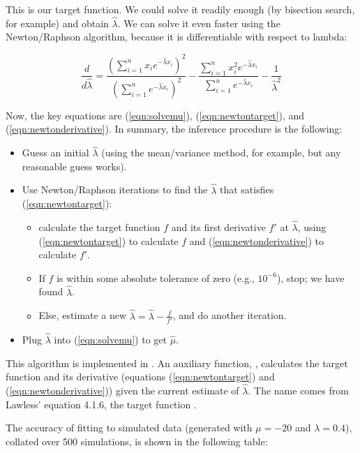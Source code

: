 This is our target function. We could solve it readily enough (by
bisection search, for example) and obtain $\hat{\lambda}$. We can
solve it even faster using the Newton/Raphson algorithm, because it is
differentiable with respect to lambda:

\begin{equation}
\frac{d}{d\hat{\lambda}} = 
\frac{\left( \sum_{i=1}^{n} x_i e^{-\hat{\lambda} x_i} \right)^2 } 
     {\left( \sum_{i=1}^{n} e^{-\hat{\lambda} x_i}     \right)^2 }
-
\frac{\sum_{i=1}^{n} x_i^2 e^{-\hat{\lambda} x_i}}
     {\sum_{i=1}^{n} e^{-\hat{\lambda} x_i}}
-
\frac{1}{\hat{\lambda}^2}
\label{eqn:newtonderivative}
\end{equation}

Now, the key equations are (\ref{eqn:solvemu}),
(\ref{eqn:newtontarget}), and (\ref{eqn:newtonderivative}). In
summary, the inference procedure is the following:

\begin{itemize}
\item Guess an initial $\hat{\lambda}$ (using the mean/variance
  method, for example, but any reasonable guess works).
\item Use Newton/Raphson iterations to find the $\hat{\lambda}$ that satisfies
      (\ref{eqn:newtontarget}):
	\begin{itemize}
	\item calculate the target function $f$ and 
         its first derivative $f'$ at $\hat{\lambda}$, using 
	(\ref{eqn:newtontarget}) to calculate $f$ and 
	(\ref{eqn:newtonderivative}) to calculate $f'$.
	\item If $f$ is within some absolute tolerance of zero 
	(e.g., $10^{-6}$), stop; we have found $\hat{\lambda}$.
	\item Else, estimate a new $\hat{\lambda} = \hat{\lambda} - \frac{f}{f'}$,
	  and do another iteration.
	\end{itemize}
\item Plug $\hat{\lambda}$ into (\ref{eqn:solvemu}) to get $\hat{\mu}$.
\end{itemize}

This algorithm is implemented in .  An
auxiliary function, , calculates the target
function and its derivative (equations (\ref{eqn:newtontarget}) and
(\ref{eqn:newtonderivative})) given the current estimate of
$\hat{\lambda}$.  The name comes from Lawless' equation 4.1.6, the
target function \citep{Lawless82}.

The accuracy of fitting to simulated data (generated with $\mu=-20$
and $\lambda=0.4$), collated over 500 simulations, is shown in the
following table:

